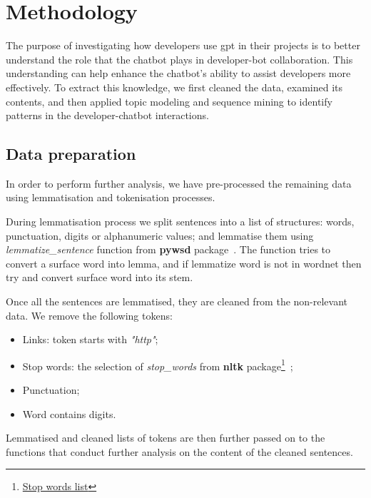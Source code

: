 \chapter{Methodology}\label{methodology}
The purpose of investigating how developers use \acrfull{gpt} in their projects is to better understand the role that the chatbot plays in developer-bot collaboration. This understanding can help enhance the chatbot's ability to assist developers more effectively. To extract this knowledge, we first cleaned the data, examined its contents, and then applied topic modeling and sequence mining to identify patterns in the developer-chatbot interactions.

\section{Data preparation}\label{sec:data-prep}
In order to perform further analysis, we have pre-processed the remaining data using lemmatisation and tokenisation processes.  

During lemmatisation process we split sentences into a list of structures: words, punctuation, digits or alphanumeric values; and lemmatise them using \textit{lemmatize\_sentence} function from \textbf{pywsd} package~\cite{pywsd14}. The function tries to convert a surface word into lemma, and if lemmatize word is not in wordnet then try and convert surface word into its stem. 

Once all the sentences are lemmatised, they are cleaned from the non-relevant data. We remove the following tokens: 
\begin{itemize}
    \item Links: token starts with \textit{"http"};
    \item Stop words: the selection of \textit{stop\_words} from \textbf{nltk} package\footnote{\href{https://www.geeksforgeeks.org/removing-stop-words-nltk-python/}{Stop words list}}~\cite{nltk};
    \item Punctuation; 
    \item Word contains digits.
\end{itemize}

Lemmatised and cleaned lists of tokens are then further passed on to the functions that conduct further analysis on the content of the cleaned sentences. 

